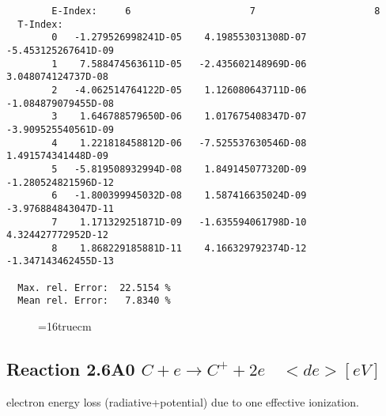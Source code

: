 \documentclass[12pt,dvipdfmx]{article}
\begin{document}
\begin{small}
\begin{verbatim}
        E-Index:     6                     7                     8
  T-Index:
        0   -1.279526998241D-05    4.198553031308D-07   -5.453125267641D-09
        1    7.588474563611D-05   -2.435602148969D-06    3.048074124737D-08
        2   -4.062514764122D-05    1.126080643711D-06   -1.084879079455D-08
        3    1.646788579650D-06    1.017675408347D-07   -3.909525540561D-09
        4    1.221818458812D-06   -7.525537630546D-08    1.491574341448D-09
        5   -5.819508932994D-08    1.849145077320D-09   -1.280524821596D-12
        6   -1.800399945032D-08    1.587416635024D-09   -3.976884843047D-11
        7    1.171329251871D-09   -1.635594061798D-10    4.324427772952D-12
        8    1.868229185881D-11    4.166329792374D-12   -1.347143462455D-13

  Max. rel. Error:  22.5154 %
  Mean rel. Error:   7.8340 %

\end{verbatim}\end{small}
\begin{figure} \label{2.3.13aec}
\epsfxsize=16truecm
\end{figure}
\newpage


\subsection{
  Reaction 2.6A0 $C  + e \rightarrow C^+   + 2e $ \ $<de> [eV] $
}

  electron energy loss (radiative+potential) due to one effective ionization.
\end{document}
